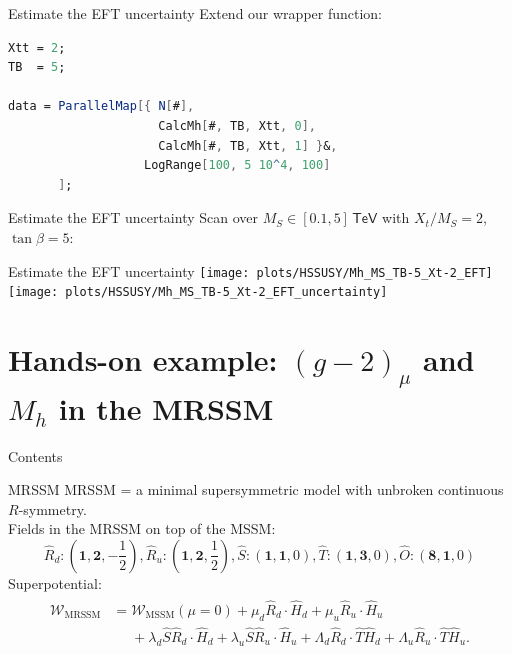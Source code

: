 \documentclass[hyperref={pdfpagelabels=false},ngerman]{beamer}
\newcommand{\eh}[1]{\,\mathsf{#1}}
\newcommand{\MS}{\ensuremath{M_S}}
\begin{document}
\begin{frame}{Estimate the EFT uncertainty}
  Extend our wrapper function:\\[2em]
  \usebox{\listbox}
\end{frame}

\begin{lrbox}{\listbox}\begin{lstlisting}[language=Mathematica]
Xtt = 2;
TB  = 5;

data = ParallelMap[{ N[#],
                     CalcMh[#, TB, Xtt, 0],
                     CalcMh[#, TB, Xtt, 1] }&,
                   LogRange[100, 5 10^4, 100]
       ];
\end{lstlisting}\end{lrbox} %

\begin{frame}{Estimate the EFT uncertainty}
  Scan over $\MS \in [0.1, 5]\eh{TeV}$ with $X_t/\MS = 2$, $\tan\beta = 5$:\\[2em]
  \usebox{\listbox}
\end{frame}

\begin{frame}{Estimate the EFT uncertainty}
  \texttt{[image: plots/HSSUSY/Mh\_MS\_TB-5\_Xt-2\_EFT]}\hfill
  \texttt{[image: plots/HSSUSY/Mh\_MS\_TB-5\_Xt-2\_EFT\_uncertainty]}
\end{frame}

\section{Hands-on example: $(g-2)_\mu$ and $M_h$ in the MRSSM}

\begin{frame}{Contents}
  \tableofcontents[currentsection]  
\end{frame}

\begin{frame}{MRSSM}
  MRSSM = a minimal supersymmetric model with unbroken continuous
  $R$-symmetry.
  \\[1em]
  Fields in the MRSSM on top of the MSSM:
\begin{equation*}
 \hat{R}_d:\textstyle (\mathbf{1} ,\mathbf{2},-\frac{1}{2}) ,
 \hat{R}_u:\textstyle (\mathbf{1} ,\mathbf{2}, \frac{1}{2}) ,
 \hat{S}:\textstyle (\mathbf{1} ,\mathbf{1}, 0) ,
 \hat{T}:\textstyle (\mathbf{1} ,\mathbf{3}, 0) ,
 \hat{O}:\textstyle (\mathbf{8} ,\mathbf{1}, 0)
\end{equation*}
%
Superpotential:
%
\begin{align*}
  \begin{split}
    \mathcal{W}_{\text{MRSSM}} &= \mathcal{W}_{\text{MSSM}}(\mu = 0)
    + \mu_d \hat{R}_d \cdot \hat{H}_d + \mu_u \hat{R}_u\cdot\hat{H}_u \\
    &\phantom{={}}+ \lambda_d \hat{S} \hat{R}_d \cdot \hat{H}_d +
    \lambda_u \hat{S} \hat{R}_u\cdot\hat{H}_u +\Lambda_d
    \hat{R}_d\cdot \hat{T} \hat{H}_d +\Lambda_u \hat{R}_u\cdot\hat{T}
    \hat{H}_u .
  \end{split}
\end{align*}
\end{frame}
\end{document}
